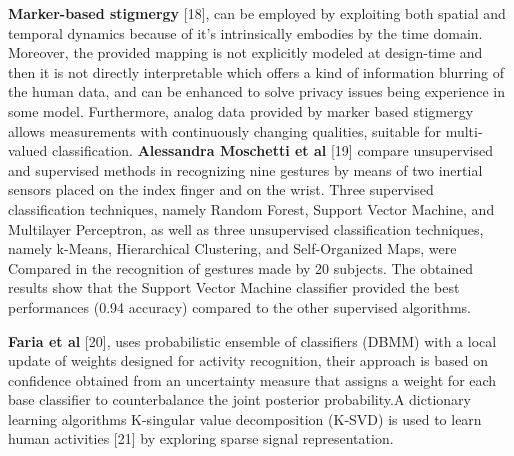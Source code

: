 \documentclass[a4paper, parskip=full]{scrartcl}
\begin{document}
\textbf{Marker-based stigmergy} [18], can be employed by exploiting both spatial and temporal dynamics because of it’s intrinsically embodies by the time domain. Moreover, the provided mapping is not explicitly modeled at design-time and then it is not directly interpretable which offers a kind of information blurring of the human data, and can be enhanced to solve privacy issues being experience in some model. Furthermore, analog data provided by marker based stigmergy allows measurements with continuously changing qualities, suitable for multi-valued classification.
\newpage
\textbf{Alessandra Moschetti et al} [19] compare unsupervised and supervised methods in recognizing nine gestures by means of two inertial sensors placed on the index finger and on the wrist. Three supervised classification techniques, namely Random Forest, Support Vector Machine, and Multilayer Perceptron, as well as three unsupervised classification techniques, namely k-Means, Hierarchical Clustering, and Self-Organized Maps, were Compared in the recognition of gestures made by 20 subjects. The obtained results show that the Support Vector Machine classifier provided the best performances (0.94 accuracy) compared to the other supervised algorithms.

\textbf{Faria et al} [20], uses probabilistic ensemble of classifiers (DBMM) with a local update of weights designed for activity recognition, their approach is based on confidence obtained from an uncertainty measure that assigns a weight for each base classifier to counterbalance the joint posterior probability.A dictionary learning algorithms K-singular value decomposition (K-SVD) is used to learn human activities [21] by exploring sparse signal representation.
\end{document}
